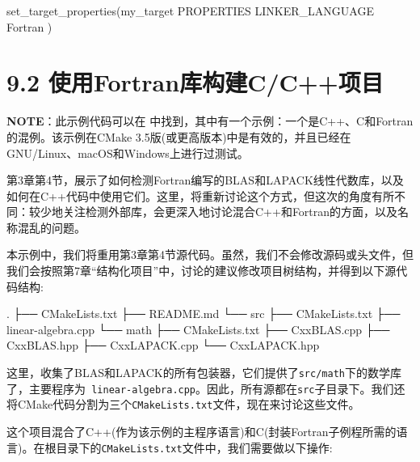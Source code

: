 \begin{codebox}[cmake]
set_target_properties(my_target
  PROPERTIES
    LINKER_LANGUAGE Fortran
  )
\end{codebox}


\section{9.2 使用Fortran库构建C/C++项目}

\begin{myInfoBox}
\textbf{NOTE}：此示例代码可以在  中找到，其中有一个示例：一个是C++、C和Fortran的混例。该示例在CMake 3.5版(或更高版本)中是有效的，并且已经在GNU/Linux、macOS和Windows上进行过测试。
\end{myInfoBox}

第3章第4节，展示了如何检测Fortran编写的BLAS和LAPACK线性代数库，以及如何在C++代码中使用它们。这里，将重新讨论这个方式，但这次的角度有所不同：较少地关注检测外部库，会更深入地讨论混合C++和Fortran的方面，以及名称混乱的问题。


本示例中，我们将重用第3章第4节源代码。虽然，我们不会修改源码或头文件，但我们会按照第7章“结构化项目”中，讨论的建议修改项目树结构，并得到以下源代码结构:

\begin{codebox}[shell]
.
├── CMakeLists.txt
├── README.md
└── src
      ├── CMakeLists.txt
      ├── linear-algebra.cpp
      └── math
            ├── CMakeLists.txt
            ├── CxxBLAS.cpp
            ├── CxxBLAS.hpp
            ├── CxxLAPACK.cpp
            └── CxxLAPACK.hpp
\end{codebox}

这里，收集了BLAS和LAPACK的所有包装器，它们提供了\texttt{src/math}下的数学库了，主要程序为\texttt{ linear-algebra.cpp}。因此，所有源都在\texttt{src}子目录下。我们还将CMake代码分割为三个\texttt{CMakeLists.txt}文件，现在来讨论这些文件。


这个项目混合了C++(作为该示例的主程序语言)和C(封装Fortran子例程所需的语言)。在根目录下的\texttt{CMakeLists.txt}文件中，我们需要做以下操作:

